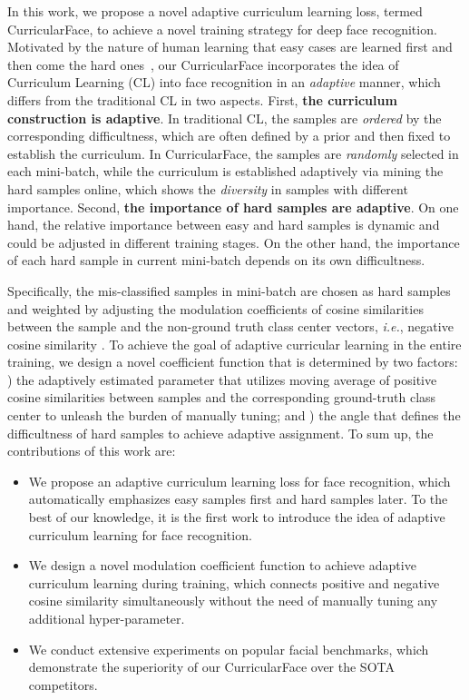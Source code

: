 \documentclass[10pt,twocolumn,letterpaper]{article}
\begin{document}
In this work, we propose a novel adaptive curriculum learning loss, termed CurricularFace, to achieve a novel training strategy for deep face recognition.
Motivated by the nature of human learning that easy cases are learned first and then come the hard ones~\cite{bengio2009curriculum}, our {CurricularFace} incorporates the idea of Curriculum Learning (CL) into face recognition in an \textit{adaptive} manner, which differs from the traditional CL in two aspects.
First, \textbf{the curriculum construction is adaptive}.
In traditional CL, the samples are \textit{ordered} by the corresponding difficultness, which are often defined by a prior and then fixed to establish the curriculum.
In CurricularFace, the samples are \textit{randomly} selected in each mini-batch, while the curriculum is established adaptively via mining the hard samples online, which shows the \textit{diversity} in samples with different importance.
Second, \textbf{the importance of hard samples are adaptive}.
On one hand, the relative importance between easy and hard samples is dynamic and could be adjusted in different training stages.
On the other hand, the importance of each hard sample in current mini-batch depends on its own difficultness.

Specifically, the mis-classified samples in mini-batch are chosen as hard samples and weighted by adjusting the modulation coefficients  of cosine similarities between the sample and the non-ground truth class center vectors, \textit{i.e.}, negative cosine similarity .
To achieve the goal of adaptive curricular learning in the entire training, we design a novel coefficient function  that is determined by two factors:
) the adaptively estimated parameter  that utilizes moving average of positive cosine similarities between samples and the corresponding ground-truth class center
to unleash the burden of manually tuning;
and ) the angle  that defines the difficultness of hard samples to achieve adaptive assignment.
To sum up, the contributions of this work are: \begin{itemize}
\item We propose an adaptive curriculum learning loss for face recognition, which automatically emphasizes easy samples first and hard samples later.
To the best of our knowledge, it is the first work to introduce the idea of adaptive curriculum learning for face recognition.
\item We design a novel modulation coefficient function  to achieve adaptive curriculum learning during training, which connects positive and negative cosine similarity simultaneously without the need of manually tuning any additional hyper-parameter.
\item We conduct extensive experiments on popular facial benchmarks, which demonstrate the superiority of our CurricularFace over the SOTA competitors.
\end{itemize}
\end{document}
